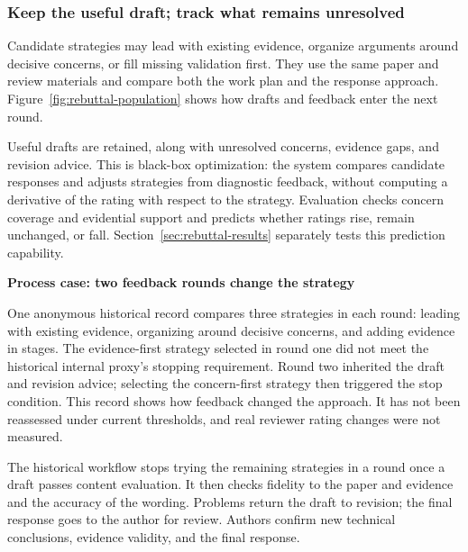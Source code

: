 \subsubsection{Keep the useful draft; track what remains unresolved}
Candidate strategies may lead with existing evidence, organize arguments around decisive concerns, or fill missing validation first. They use the same paper and review materials and compare both the work plan and the response approach. Figure~\ref{fig:rebuttal-population} shows how drafts and feedback enter the next round.


Useful drafts are retained, along with unresolved concerns, evidence gaps, and revision advice. This is black-box optimization: the system compares candidate responses and adjusts strategies from diagnostic feedback, without computing a derivative of the rating with respect to the strategy. Evaluation checks concern coverage and evidential support and predicts whether ratings rise, remain unchanged, or fall. Section~\ref{sec:rebuttal-results} separately tests this prediction capability.

\begin{insight}
\textbf{Process case: two feedback rounds change the strategy}\par
One anonymous historical record compares three strategies in each round: leading with existing evidence, organizing around decisive concerns, and adding evidence in stages. The evidence-first strategy selected in round one did not meet the historical internal proxy's stopping requirement. Round two inherited the draft and revision advice; selecting the concern-first strategy then triggered the stop condition. This record shows how feedback changed the approach. It has not been reassessed under current thresholds, and real reviewer rating changes were not measured.
\end{insight}

The historical workflow stops trying the remaining strategies in a round once a draft passes content evaluation. It then checks fidelity to the paper and evidence and the accuracy of the wording. Problems return the draft to revision; the final response goes to the author for review. Authors confirm new technical conclusions, evidence validity, and the final response.
